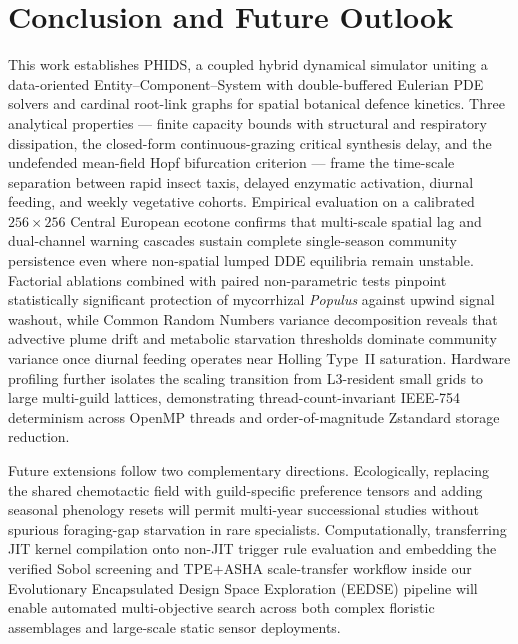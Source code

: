 
\section{Conclusion and Future Outlook}
\label{sec:conclusion}

This work establishes PHIDS, a coupled hybrid dynamical simulator uniting a data-oriented Entity--Component--System with double-buffered Eulerian PDE solvers and cardinal root-link graphs for spatial botanical defence kinetics. Three analytical properties --- finite capacity bounds with structural and respiratory dissipation, the closed-form continuous-grazing critical synthesis delay, and the undefended mean-field Hopf bifurcation criterion --- frame the time-scale separation between rapid insect taxis, delayed enzymatic activation, diurnal feeding, and weekly vegetative cohorts. Empirical evaluation on a calibrated $256 \times 256$ Central European ecotone confirms that multi-scale spatial lag and dual-channel warning cascades sustain complete single-season community persistence even where non-spatial lumped DDE equilibria remain unstable. Factorial ablations combined with paired non-parametric tests pinpoint statistically significant protection of mycorrhizal \textit{Populus} against upwind signal washout, while Common Random Numbers variance decomposition reveals that advective plume drift and metabolic starvation thresholds dominate community variance once diurnal feeding operates near Holling Type~II saturation. Hardware profiling further isolates the scaling transition from L3-resident small grids to large multi-guild lattices, demonstrating thread-count-invariant IEEE-754 determinism across OpenMP threads and order-of-magnitude Zstandard storage reduction.

Future extensions follow two complementary directions. Ecologically, replacing the shared chemotactic field with guild-specific preference tensors and adding seasonal phenology resets will permit multi-year successional studies without spurious foraging-gap starvation in rare specialists. Computationally, transferring JIT kernel compilation onto non-JIT trigger rule evaluation and embedding the verified Sobol screening and TPE+ASHA scale-transfer workflow inside our Evolutionary Encapsulated Design Space Exploration (EEDSE) pipeline \cite{forster2024topology, dietrich2025visual} will enable automated multi-objective search across both complex floristic assemblages and large-scale static sensor deployments.


